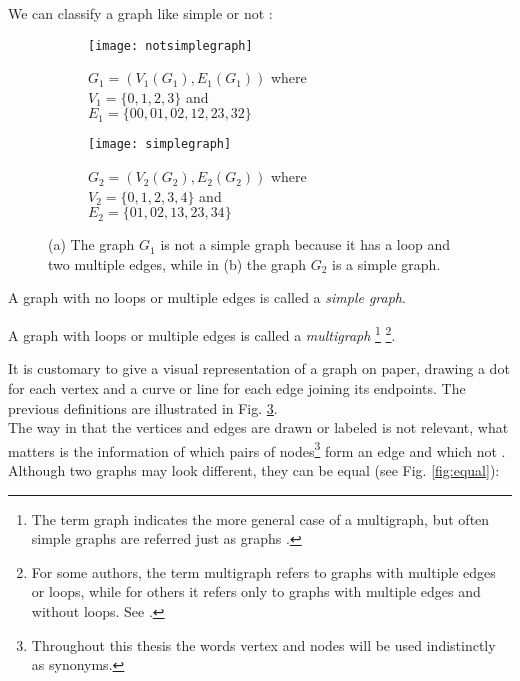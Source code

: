 We can classify a graph like simple or not \cite{diestel}:\\

\begin{figure}
	\centering
	\begin{subfigure}[b]{0.4\textwidth}
		\centering
		\texttt{[image: notsimplegraph]}
		\caption{$G_{1}=(V_{1}(G_{1}),E_{1}(G_{1}))$ where\\   $V_{1}=\{0,1,2,3\}$ and\\$E_{1}=\{00,01,02,12,23,32\}$}
		\label{fig:notsimplegraph}
	\end{subfigure}
	\hfill
	\begin{subfigure}[b]{0.4\textwidth}
		\centering
		\texttt{[image: simplegraph]}
		\caption{$G_{2}=(V_{2}(G_{2}),E_{2}(G_{2}))$ where\\   $V_{2}=\{0,1,2,3,4\}$ and\\$E_{2}=\{01,02,13,23,34\}$}
		\label{fig:simplegraph}
	\end{subfigure}
	\caption[A simple graph versus a graph that is not simple.]{(a) The graph $G_{1}$ is not a simple graph because it has a loop and two multiple edges, while in (b) the graph $G_{2}$ is a simple graph.}
	\label{fig:simplevsnotgraph}
\end{figure}

\begin{defn}
	\label{simple}
	A graph with no loops or multiple edges is called a \textit{simple graph}.\\
\end{defn}

\begin{defn}
\label{multigraph}
	A graph with loops or multiple edges is called a \textit{multigraph} \footnote{The term graph indicates the more general case of a multigraph, but often simple graphs are referred just as graphs \cite{douglas}.} \footnote{For some authors, the term multigraph refers to graphs with multiple edges or loops, while for others it refers only to graphs with multiple edges and without loops. See \cite{multigraph}.}.\\
\end{defn}

It is customary to give a visual representation of a graph on paper, drawing a dot for each vertex and a curve or line for each edge joining its endpoints. The previous definitions are illustrated in Fig. \ref{fig:simplevsnotgraph}.\\


The way in that the vertices and edges are drawn or labeled is not relevant, what matters is the information of which pairs of nodes\footnote{Throughout this thesis the words vertex and nodes will be used indistinctly as synonyms.} form an edge and which not \cite{diestel}. Although two graphs may look different, they can be equal (see Fig. \ref{fig:equal}):\\  

